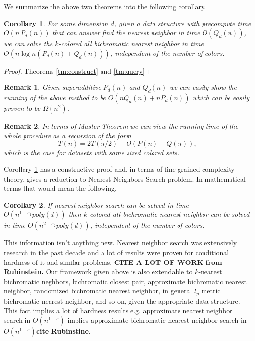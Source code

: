 \documentclass{article}
\newcommand\todo[1]{{\bf \textcolor{bordeaux}{#1}}}
\newtheorem{corollary}{Corollary}
\newtheorem{remark}{Remark}
\newtheorem{proof}{Proof}
\begin{document}
We summarize the above two theorems into the following corollary.
\begin{corollary}\label{cor:online}
For some dimension $d$, given a data structure with precompute time $O\left(n\, P_d(n)\right)$
that can answer find the nearest neighbor in time $O\left(Q_d(n)\right)$, we can solve the $k$-colored all bichromatic nearest neighbor in time $O\left(n \log n \left(P_d(n) + Q_d(n)\right)\right)$, independent of the number of colors.
\end{corollary}
\begin{proof} Theorems \ref{tm:construct} and \ref{tm:query} \end{proof}
\begin{remark}
Given superadditive $P_d(n)$ and $Q_d(n)$ we can easily show the running of the above method to be $O(nQ_d(n) + nP_d(n))$ which can be easily proven to be $\Omega(n^2)$.
\end{remark}
\begin{remark}
In terms of Master Theorem we can view the running time of the whole procedure as a recursion of the form
$$ T(n) = 2T(n/2) + O(P(n) + Q(n)), $$
which is the case for datasets with same sized colored sets.
\end{remark}

Corollary \ref{cor:online} has a constructive proof and, in terms of fine-grained complexity theory, gives a reduction to Nearest Neighbors Search problem.
In mathematical terms that would mean the following.
\begin{corollary}
If nearest neighbor search can be solved in time $O(n^{1-\varepsilon_1}poly(d))$ then $k$-colored all bichromatic nearest neighbor can be solved in time $O(n^{2-\varepsilon_2}poly(d))$, independent of the number of colors.
\end{corollary}
This information isn't anything new.
Nearest neighbor search was extensively research in the past decade and a lot of results were proven for conditional hardness of it and similar problems.
\todo{CITE A LOT OF WORK from Rubinstein.}
Our framework given above is also extendable to $k$-nearest bichromatic neghbors, bichromatic closest pair, approximate bichromatic nearest neighbor, randomized bichromatic nearest neighbor, in general $l_p$ metric bichromatic nearest neighbor, and so on, given the appropriate data structure.
This fact implies a lot of hardness results e.g. approximate nearest neighbor search in $O(n^{1-\varepsilon})$ implies approximate bichromatic nearest neighbor search in $O(n^{1-\varepsilon})$\todo{cite Rubinstine}.
\end{document}
